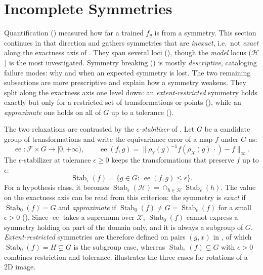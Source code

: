 \documentclass[mathematics,review,submit,moreauthors]{Definitions/mdpi}
\begin{document}
\section{Incomplete Symmetries}\label{sec:incomplete-symmetries}
Quantification () measured how far a trained $f_\theta$ is from a symmetry.
This section continues in that direction and gathers symmetries that are \emph{inexact}, i.e.\ not \emph{exact} along the exactness axis of .
They span several loci (), though the \emph{model} locus ($\mathcal{H}$) is the most investigated.
Symmetry breaking () is mostly \emph{descriptive}, cataloging failure modes: why and when an expected symmetry is lost.
The two remaining subsections are more prescriptive and explain how a symmetry weakens.
They split along the exactness axis one level down: an \emph{extent-restricted} symmetry holds exactly but only for a restricted set of transformations or points (), while an \emph{approximate} one holds on all of $G$ up to a tolerance ().

The two relaxations are contrasted by the \emph{$\epsilon$-stabilizer} of \citet{petrache2023}.
Let $G$ be a candidate group of transformations and write the equivariance error of a map $f$ under $G$ as:
$$
    \operatorname{ee}\colon\mathcal{F}\times G\to[0,+\infty),\qquad \operatorname{ee}(f,g)=\big\|\rho_Y(g)^{-1}f(\rho_X(g)\,\cdot)-f\big\|_\infty.
$$
The $\epsilon$-stabilizer at tolerance $\epsilon\geq 0$ keeps the transformations that preserve $f$ up to $\epsilon$:
$$
    \operatorname{Stab}_\epsilon(f)=\{g\in G:\ \operatorname{ee}(f,g)\le\epsilon\}.
$$
For a hypothesis class, it becomes $\operatorname{Stab}_\epsilon(\mathcal{H})=\cap_{h\in \mathcal{H}}\operatorname{Stab}_\epsilon(h)$.
The value on the exactness axis can be read from this criterion: the symmetry is \emph{exact} if $\operatorname{Stab}_0(f)=G$ and \emph{approximate} if $\operatorname{Stab}_0(f)\neq G=\operatorname{Stab}_\epsilon(f)$ for a small $\epsilon>0$ ().
Since $\operatorname{ee}$ takes a supremum over $\mathcal X$, $\operatorname{Stab}_0(f)$ cannot express a symmetry holding on part of the domain only, and it is always a subgroup of $G$.
\emph{Extent-restricted} symmetries are therefore defined on pairs $(g,x)$ in , of which $\operatorname{Stab}_0(f)=H\subsetneq G$ is the subgroup case, whereas $\operatorname{Stab}_\epsilon(f)\subsetneq G$ with $\epsilon>0$ combines restriction and tolerance.
 illustrates the three cases for rotations of a 2D image.
\end{document}
